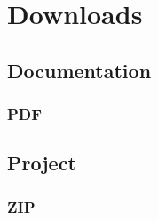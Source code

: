 \documentclass[letterpaper,10pt,english]{sphinxmanual}
\begin{document}
\chapter{Downloads}
\label{\detokenize{downloads:downloads}}\label{\detokenize{downloads::doc}}

\section{Documentation}
\label{\detokenize{downloads:documentation}}

\subsection{PDF}
\label{\detokenize{downloads:pdf}}

\section{Project}
\label{\detokenize{downloads:project}}

\subsection{ZIP}
\label{\detokenize{downloads:zip}}



\renewcommand{\indexname}{Index}
\printindex
\end{document}
